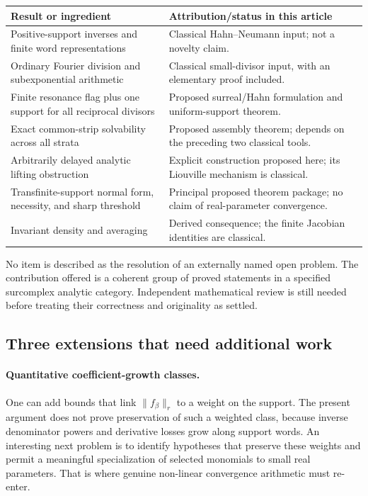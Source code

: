 \documentclass[11pt,letterpaper]{article}
\theoremstyle{definition}
\theoremstyle{remark}
\numberwithin{equation}{section}
\begin{document}
\begin{center}
\small
\begin{tabular}{@{}p{}p{}@{}}
\toprule
Result or ingredient & Attribution/status in this article\\
\midrule
Positive-support inverses and finite word representations & Classical Hahn--Neumann input; not a novelty claim.\\[4pt]
Ordinary Fourier division and subexponential arithmetic & Classical small-divisor input, with an elementary proof included.\\[4pt]
Finite resonance flag plus one support for all reciprocal divisors & Proposed surreal/Hahn formulation and uniform-support theorem.\\[4pt]
Exact common-strip solvability across all strata & Proposed assembly theorem; depends on the preceding two classical tools.\\[4pt]
Arbitrarily delayed analytic lifting obstruction & Explicit construction proposed here; its Liouville mechanism is classical.\\[4pt]
Transfinite-support normal form, necessity, and sharp threshold & Principal proposed theorem package; no claim of real-parameter convergence.\\[4pt]
Invariant density and averaging & Derived consequence; the finite Jacobian identities are classical.\\
\bottomrule
\end{tabular}
\end{center}

No item is described as the resolution of an externally named open problem.
The contribution offered is a coherent group of proved statements in a
specified surcomplex analytic category.  Independent mathematical review is
still needed before treating their correctness and originality as settled.

\subsection{Three extensions that need additional work}

\paragraph{Quantitative coefficient-growth classes.}
One can add bounds that link $\|f_\beta\|_r$ to a weight on the support.
The present argument does not prove preservation of such a weighted class,
because inverse denominator powers and derivative losses grow along support
words.  An interesting next problem is to identify hypotheses that preserve
these weights and permit a meaningful specialization of selected monomials
to small real parameters.  That is where genuine non-linear convergence
arithmetic must re-enter.
\end{document}
